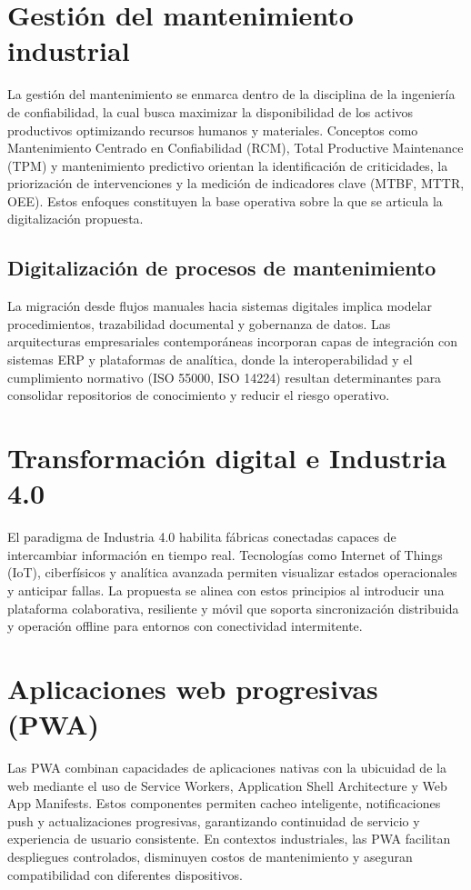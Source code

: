 \documentclass[12pt,a4paper]{report}
\begin{document}
\section*{Gestión del mantenimiento industrial}
La gestión del mantenimiento se enmarca dentro de la disciplina de la ingeniería de confiabilidad, la cual busca maximizar la disponibilidad de los activos productivos optimizando recursos humanos y materiales. Conceptos como Mantenimiento Centrado en Confiabilidad (RCM), Total Productive Maintenance (TPM) y mantenimiento predictivo orientan la identificación de criticidades, la priorización de intervenciones y la medición de indicadores clave (MTBF, MTTR, OEE). Estos enfoques constituyen la base operativa sobre la que se articula la digitalización propuesta.

\subsection*{Digitalización de procesos de mantenimiento}
La migración desde flujos manuales hacia sistemas digitales implica modelar procedimientos, trazabilidad documental y gobernanza de datos. Las arquitecturas empresariales contemporáneas incorporan capas de integración con sistemas ERP y plataformas de analítica, donde la interoperabilidad y el cumplimiento normativo (ISO 55000, ISO 14224)\cite{iso55000:2014,iso14224:2016} resultan determinantes para consolidar repositorios de conocimiento y reducir el riesgo operativo.

\section*{Transformación digital e Industria 4.0}
El paradigma de Industria 4.0 habilita fábricas conectadas capaces de intercambiar información en tiempo real. Tecnologías como Internet of Things (IoT), ciberfísicos y analítica avanzada permiten visualizar estados operacionales y anticipar fallas. La propuesta se alinea con estos principios al introducir una plataforma colaborativa, resiliente y móvil que soporta sincronización distribuida y operación offline para entornos con conectividad intermitente.

\section*{Aplicaciones web progresivas (PWA)}
Las PWA combinan capacidades de aplicaciones nativas con la ubicuidad de la web mediante el uso de Service Workers, Application Shell Architecture y Web App Manifests. Estos componentes permiten cacheo inteligente, notificaciones push y actualizaciones progresivas, garantizando continuidad de servicio y experiencia de usuario consistente. En contextos industriales, las PWA facilitan despliegues controlados, disminuyen costos de mantenimiento y aseguran compatibilidad con diferentes dispositivos.
\end{document}
